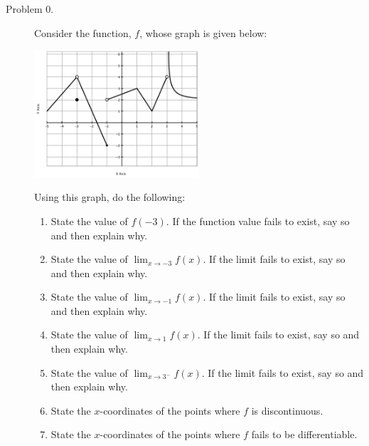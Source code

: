 \documentclass[addpoints]{exam}
\begin{document}
\begin{description}
	\item[Problem 0.] Consider the function, $f$, whose graph is given below: 
	\begin{center}
		\includegraphics[width=0.5\textwidth]{examprob0a-1}
	\end{center}
	Using this graph, do the following:
	\begin{enumerate}
		\item State the value of $f(-3)$. If the function value fails to exist, say so and then explain why. 
		\item State the value of $\displaystyle{\lim_{x \to {-3}} f(x)}$. If the limit fails to exist, say so and then explain why. 
		\item State the value of $\displaystyle{\lim_{x \to {-1}} f(x)}$. If the limit fails to exist, say so and then explain why. 
		\item State the value of $\displaystyle{\lim_{x \to 1} f(x)}$. If the limit fails to exist, say so and then explain why. 	
		\item State the value of $\displaystyle{\lim_{x \to 3^-} f(x)}$. If the limit fails to exist, say so and then explain why. 	
		\item State the $x$-coordinates of the points where $f$ is discontinuous. 
		\item State the $x$-coordinates of the points where $f$ fails to be differentiable. 
	\end{enumerate}


\end{description}
\end{document}
